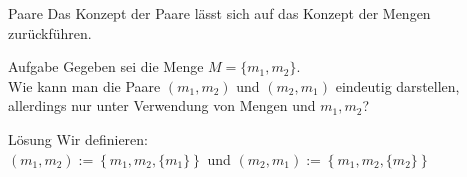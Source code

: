 \begin{frame}{Paare}
	Das Konzept der Paare lässt sich auf das Konzept der Mengen zurückführen.
	
	\begin{block}{Aufgabe}
		Gegeben sei die Menge $M = \{m_1, m_2\}$.\\
		Wie kann man die Paare $(m_1, m_2)$ und $(m_2, m_1)$ eindeutig darstellen, allerdings nur unter Verwendung von Mengen und $m_1, m_2$?
	\end{block}
	\pause
	
	\begin{block}{Lösung}
		Wir definieren: \\ 
		$(m_1, m_2) := \left\lbrace m_1, m_2, \{m_1\}\right\rbrace$ und $(m_2, m_1) := \left\lbrace m_1, m_2, \{m_2\}\right\rbrace$
	\end{block}
\end{frame}